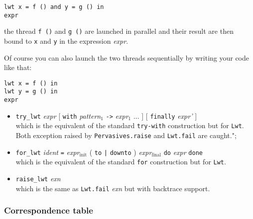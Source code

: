 \lstset{language=[Objective]Caml}\begin{lstlisting}
lwt x = f () and y = g () in
expr

\end{lstlisting}
the thread {\tt f ()} and {\tt g ()} are launched in parallel
and their result are then bound to {\tt x} and {\tt y} in the
expression \emph{expr}.



Of course you can also launch the two threads sequentially by
writing your code like that:



\lstset{language=[Objective]Caml}\begin{lstlisting}
lwt x = f () in
lwt y = g () in
expr

\end{lstlisting}
\begin{itemize}
\item  {\tt try\_lwt} \emph{expr} [ {\tt with} \emph{pattern$_{\mbox{1}}$}
{\tt ->} \emph{expr$_{\mbox{1}}$} ... ] [ {\tt finally} \emph{expr'} ]
\mbox{}\\
which is the equivalent of the standard {\tt try-with}
construction but for {\tt Lwt}. Both exception raised by
{\tt Pervasives.raise} and {\tt Lwt.fail} are caught.";

\end{itemize}

\begin{itemize}
\item  {\tt for\_lwt} \emph{ident} {\tt =} \emph{expr$_{\mbox{init}}$} ( {\tt to} {\tt |}
{\tt downto} ) \emph{expr$_{\mbox{final}}$} {\tt do} \emph{expr}
{\tt done}
\mbox{}\\
which is the equivalent of the standard {\tt for} construction
but for {\tt Lwt}.

\end{itemize}

\begin{itemize}
\item  {\tt raise\_lwt} \emph{exn}
\mbox{}\\
which is the same as {\tt Lwt.fail} \emph{exn} but with backtrace support.

\end{itemize}

\subsubsection{ Correspondence table }

